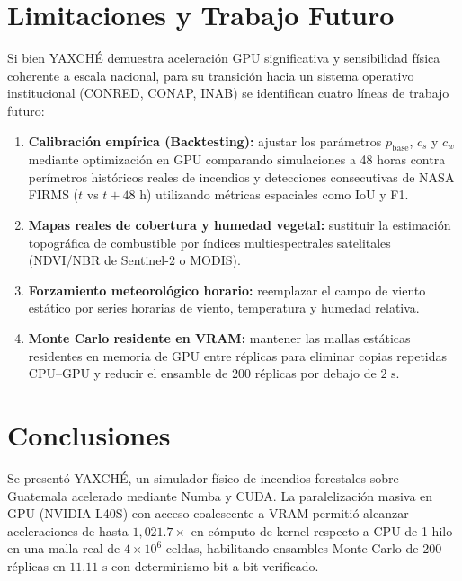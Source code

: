 \documentclass[twocolumn,10pt]{article}
\begin{document}
\section{Limitaciones y Trabajo Futuro}

Si bien YAXCHÉ demuestra aceleración GPU significativa y sensibilidad física coherente a escala nacional, para su transición hacia un sistema operativo institucional (CONRED, CONAP, INAB) se identifican cuatro líneas de trabajo futuro:

\begin{enumerate}
    \item \textbf{Calibración empírica (Backtesting):} ajustar los parámetros $p_{\text{base}}$, $c_s$ y $c_w$ mediante optimización en GPU comparando simulaciones a 48 horas contra perímetros históricos reales de incendios y detecciones consecutivas de NASA FIRMS ($t$ vs $t+48\text{ h}$) utilizando métricas espaciales como IoU y F1.
    \item \textbf{Mapas reales de cobertura y humedad vegetal:} sustituir la estimación topográfica de combustible por índices multiespectrales satelitales (NDVI/NBR de Sentinel-2 o MODIS).
    \item \textbf{Forzamiento meteorológico horario:} reemplazar el campo de viento estático por series horarias de viento, temperatura y humedad relativa.
    \item \textbf{Monte Carlo residente en VRAM:} mantener las mallas estáticas residentes en memoria de GPU entre réplicas para eliminar copias repetidas CPU--GPU y reducir el ensamble de $200$ réplicas por debajo de $2\text{ s}$.
\end{enumerate}

\section{Conclusiones}

Se presentó YAXCHÉ, un simulador físico de incendios forestales sobre Guatemala acelerado mediante Numba y CUDA. La paralelización masiva en GPU (NVIDIA L40S) con acceso coalescente a VRAM permitió alcanzar aceleraciones de hasta $1{,}021.7\times$ en cómputo de kernel respecto a CPU de 1 hilo en una malla real de $4\times 10^6$ celdas, habilitando ensambles Monte Carlo de $200$ réplicas en $11.11\text{ s}$ con determinismo bit-a-bit verificado.
\end{document}
